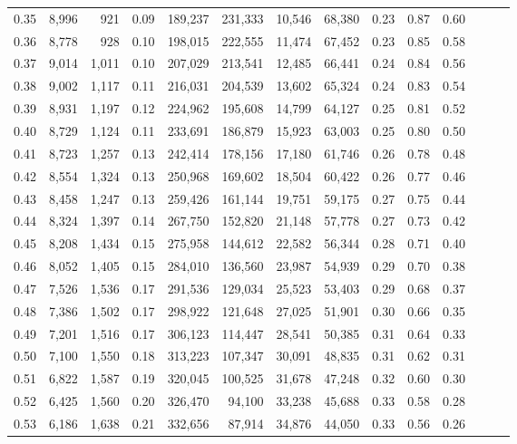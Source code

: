 \begin{tabular}{rrrrrrrrrrrrrr}
0.35 &  8,996 &    921 &  0.09 &  189,237 &  231,333 &  10,546 &  68,380 &  0.23 &  0.87 &      0.60 \\
0.36 &  8,778 &    928 &  0.10 &  198,015 &  222,555 &  11,474 &  67,452 &  0.23 &  0.85 &      0.58 \\
0.37 &  9,014 &  1,011 &  0.10 &  207,029 &  213,541 &  12,485 &  66,441 &  0.24 &  0.84 &      0.56 \\
0.38 &  9,002 &  1,117 &  0.11 &  216,031 &  204,539 &  13,602 &  65,324 &  0.24 &  0.83 &      0.54 \\
0.39 &  8,931 &  1,197 &  0.12 &  224,962 &  195,608 &  14,799 &  64,127 &  0.25 &  0.81 &      0.52 \\
0.40 &  8,729 &  1,124 &  0.11 &  233,691 &  186,879 &  15,923 &  63,003 &  0.25 &  0.80 &      0.50 \\
0.41 &  8,723 &  1,257 &  0.13 &  242,414 &  178,156 &  17,180 &  61,746 &  0.26 &  0.78 &      0.48 \\
0.42 &  8,554 &  1,324 &  0.13 &  250,968 &  169,602 &  18,504 &  60,422 &  0.26 &  0.77 &      0.46 \\
0.43 &  8,458 &  1,247 &  0.13 &  259,426 &  161,144 &  19,751 &  59,175 &  0.27 &  0.75 &      0.44 \\
0.44 &  8,324 &  1,397 &  0.14 &  267,750 &  152,820 &  21,148 &  57,778 &  0.27 &  0.73 &      0.42 \\
0.45 &  8,208 &  1,434 &  0.15 &  275,958 &  144,612 &  22,582 &  56,344 &  0.28 &  0.71 &      0.40 \\
0.46 &  8,052 &  1,405 &  0.15 &  284,010 &  136,560 &  23,987 &  54,939 &  0.29 &  0.70 &      0.38 \\
0.47 &  7,526 &  1,536 &  0.17 &  291,536 &  129,034 &  25,523 &  53,403 &  0.29 &  0.68 &      0.37 \\
0.48 &  7,386 &  1,502 &  0.17 &  298,922 &  121,648 &  27,025 &  51,901 &  0.30 &  0.66 &      0.35 \\
0.49 &  7,201 &  1,516 &  0.17 &  306,123 &  114,447 &  28,541 &  50,385 &  0.31 &  0.64 &      0.33 \\
0.50 &  7,100 &  1,550 &  0.18 &  313,223 &  107,347 &  30,091 &  48,835 &  0.31 &  0.62 &      0.31 \\
0.51 &  6,822 &  1,587 &  0.19 &  320,045 &  100,525 &  31,678 &  47,248 &  0.32 &  0.60 &      0.30 \\
0.52 &  6,425 &  1,560 &  0.20 &  326,470 &   94,100 &  33,238 &  45,688 &  0.33 &  0.58 &      0.28 \\
0.53 &  6,186 &  1,638 &  0.21 &  332,656 &   87,914 &  34,876 &  44,050 &  0.33 &  0.56 &      0.26 \\

\end{tabular}
